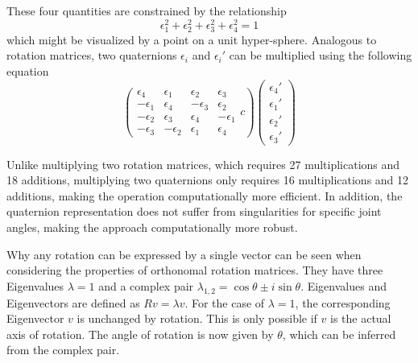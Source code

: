 These four quantities are constrained by the relationship
\begin{equation}
\epsilon_1^2+\epsilon_2^2+\epsilon_3^2+\epsilon_4^2=1
\end{equation}
which might be visualized by a point on a unit hyper-sphere. %
Analogous to rotation matrices, two quaternions $\epsilon_i$ and $\epsilon_i'$ can be multiplied using the following equation
\begin{equation}
\left(
\begin{array}{cccc}
\epsilon_4 & \epsilon_1 & \epsilon_2 & \epsilon_3\\
-\epsilon_1 & \epsilon_4 & -\epsilon_3 & \epsilon_2\\
-\epsilon_2 & \epsilon_3 & \epsilon_4 & -\epsilon_1\\
-\epsilon_3 & -\epsilon_2 & \epsilon_1 & \epsilon_4
\end{array}{c}
\right)
\left(\begin{array}{c}\epsilon_4'\\\epsilon_1'\\\epsilon_2'\\\epsilon_3'\end{array}\right)
\end{equation}

Unlike multiplying two rotation matrices, which requires 27 multiplications and 18 additions, multiplying two quaternions only requires 16 multiplications and 12 additions, making the operation computationally more efficient. In addition, the quaternion representation does not suffer from singularities for specific joint angles, making the approach computationally more robust.

Why any rotation can be expressed by a single vector can be seen when considering the properties of orthonomal rotation matrices. They have three Eigenvalues $\lambda=1$ and a complex pair $\lambda_{1,2}=\cos \theta \pm i \sin \theta$. Eigenvalues and Eigenvectors are defined as $Rv=\lambda v$. For the case of $\lambda=1$, the corresponding Eigenvector $v$ is unchanged by rotation. This is only possible if $v$ is the actual axis of rotation. The angle of rotation is now given by $\theta$, which can be inferred from the complex pair.
